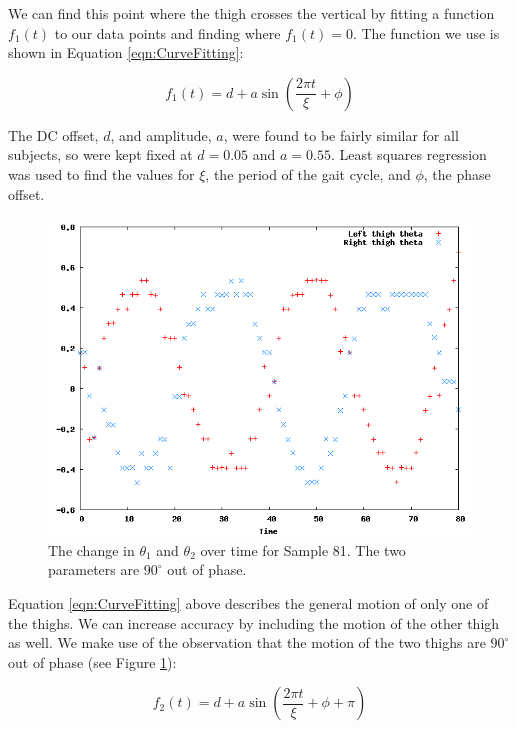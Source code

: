 We can find this point where the thigh crosses the vertical by fitting a function $f_1(t)$ to our data points and finding where $f_1(t) = 0$.
The function we use is shown in Equation \ref{eqn:CurveFitting}:

\begin{equation}
	f_1(t) = d + a \sin\left(\frac{2 \pi t}{\xi} + \phi\right)
	\label{eqn:CurveFitting}
\end{equation}

The DC offset, $d$, and amplitude, $a$, were found to be fairly similar for all subjects, so were kept fixed at $d = 0.05$ and $a = 0.55$.
Least squares regression was used to find the values for $\xi$, the period of the gait cycle, and $\phi$, the phase offset.

\begin{figure}[tb]
	\centering
	\includegraphics[width=\textwidth]{curvefitting2.png}
	\caption{The change in $\theta_1$ and $\theta_2$ over time for Sample 81.
		The two parameters are $90^\circ$ out of phase.}
	\label{CurveFitting2}
\end{figure}

Equation \ref{eqn:CurveFitting} above describes the general motion of only one of the thighs.
We can increase accuracy by including the motion of the other thigh as well.
We make use of the observation that the motion of the two thighs are $90^\circ$ out of phase (see Figure \ref{CurveFitting2}):

\begin{equation}
	f_2(t) = d + a \sin\left(\frac{2 \pi t}{\xi} + \phi + \pi\right)
	\label{eqn:CurveFitting2}
\end{equation}

